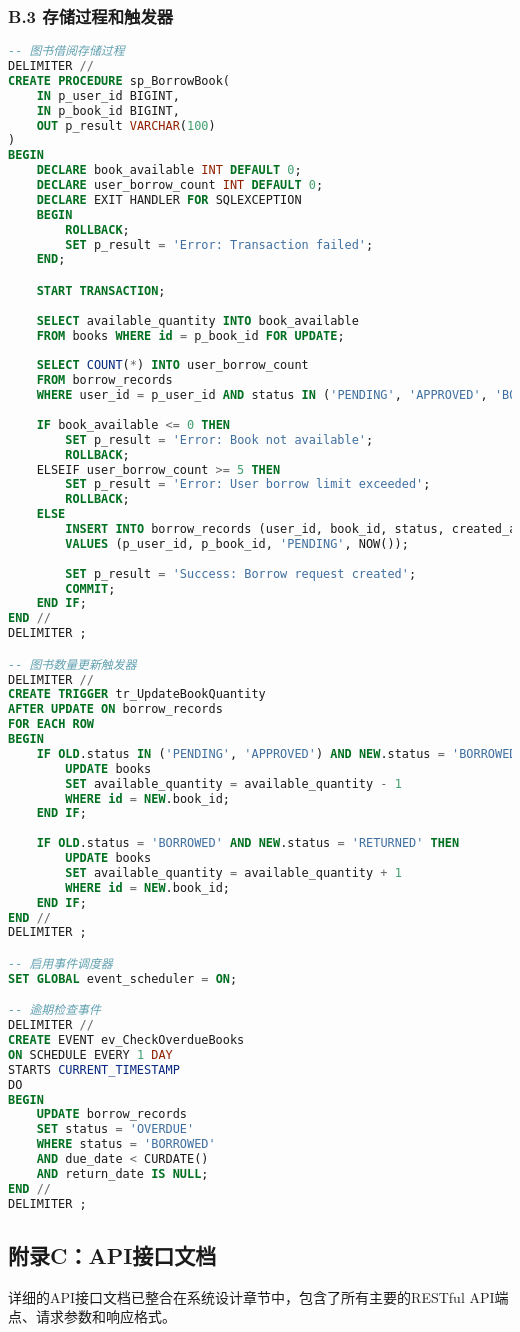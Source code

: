 \documentclass[12pt,a4paper]{article}
\begin{document}
\subsubsection*{B.3 存储过程和触发器}
\begin{lstlisting}[language=sql]
-- 图书借阅存储过程
DELIMITER //
CREATE PROCEDURE sp_BorrowBook(
    IN p_user_id BIGINT,
    IN p_book_id BIGINT,
    OUT p_result VARCHAR(100)
)
BEGIN
    DECLARE book_available INT DEFAULT 0;
    DECLARE user_borrow_count INT DEFAULT 0;
    DECLARE EXIT HANDLER FOR SQLEXCEPTION
    BEGIN
        ROLLBACK;
        SET p_result = 'Error: Transaction failed';
    END;

    START TRANSACTION;
    
    SELECT available_quantity INTO book_available 
    FROM books WHERE id = p_book_id FOR UPDATE;
    
    SELECT COUNT(*) INTO user_borrow_count 
    FROM borrow_records 
    WHERE user_id = p_user_id AND status IN ('PENDING', 'APPROVED', 'BORROWED');
    
    IF book_available <= 0 THEN
        SET p_result = 'Error: Book not available';
        ROLLBACK;
    ELSEIF user_borrow_count >= 5 THEN
        SET p_result = 'Error: User borrow limit exceeded';
        ROLLBACK;
    ELSE
        INSERT INTO borrow_records (user_id, book_id, status, created_at)
        VALUES (p_user_id, p_book_id, 'PENDING', NOW());
        
        SET p_result = 'Success: Borrow request created';
        COMMIT;
    END IF;
END //
DELIMITER ;

-- 图书数量更新触发器
DELIMITER //
CREATE TRIGGER tr_UpdateBookQuantity
AFTER UPDATE ON borrow_records
FOR EACH ROW
BEGIN
    IF OLD.status IN ('PENDING', 'APPROVED') AND NEW.status = 'BORROWED' THEN
        UPDATE books 
        SET available_quantity = available_quantity - 1 
        WHERE id = NEW.book_id;
    END IF;
    
    IF OLD.status = 'BORROWED' AND NEW.status = 'RETURNED' THEN
        UPDATE books 
        SET available_quantity = available_quantity + 1 
        WHERE id = NEW.book_id;
    END IF;
END //
DELIMITER ;

-- 启用事件调度器
SET GLOBAL event_scheduler = ON;

-- 逾期检查事件
DELIMITER //
CREATE EVENT ev_CheckOverdueBooks
ON SCHEDULE EVERY 1 DAY
STARTS CURRENT_TIMESTAMP
DO
BEGIN
    UPDATE borrow_records 
    SET status = 'OVERDUE'
    WHERE status = 'BORROWED' 
    AND due_date < CURDATE()
    AND return_date IS NULL;
END //
DELIMITER ;
\end{lstlisting}

\subsection*{附录C：API接口文档}

详细的API接口文档已整合在系统设计章节中，包含了所有主要的RESTful API端点、请求参数和响应格式。
\end{document}
